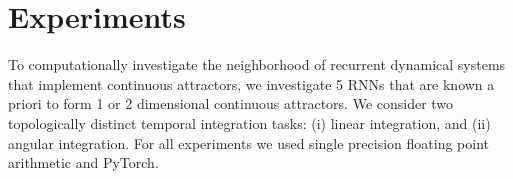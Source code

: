 \documentclass{article} %
\newcounter{ct}
\theoremstyle{definition}
\theoremstyle{remark}
\begin{document}
%


%

\section{Experiments}
To computationally investigate the neighborhood of recurrent dynamical systems that implement continuous attractors, we investigate 5 RNNs that are known a priori to form 1 or 2 dimensional continuous attractors.
We consider two topologically distinct temporal integration tasks: (i) linear integration, and (ii) angular integration.
For all experiments we used single precision floating point arithmetic and PyTorch.
%
\end{document}
